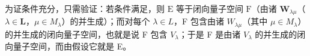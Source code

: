 为证条件充分，只需验证：若条件满足，则 \(\mathrm{E}\) 等于闭向量子空间 \(\mathrm{F}\)（由诸 \(\mathbf{W}_{\lambda \mu}\)（\(\lambda \in \mathbf{L}\)，\(\mu\in M_{\lambda}\)）的并生成）；而对每个 \(\lambda\in L\)，F 包含由诸 \(W_{\lambda\mu}\)（其中 \(\mu\in M_{\lambda}\)）的并生成的闭向量子空间，也就是说 F 包含 \(V_{\lambda}\)；于是 F 是由诸 \(V_{\lambda}\) 的并生成的闭向量子空间，而由假设它就是 E。

